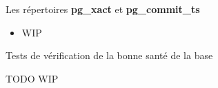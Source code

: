 
\begin{frame}{Les répertoires \textbf{pg\_xact} et \textbf{pg\_commit\_ts}}

\begin{itemize}
   \item WIP
\end{itemize}

\end{frame}


\begin{frame}[fragile]{Tests de vérification de la bonne santé de la base}

   TODO
   WIP

\begin{toile}
\end{toile}

\end{frame}

